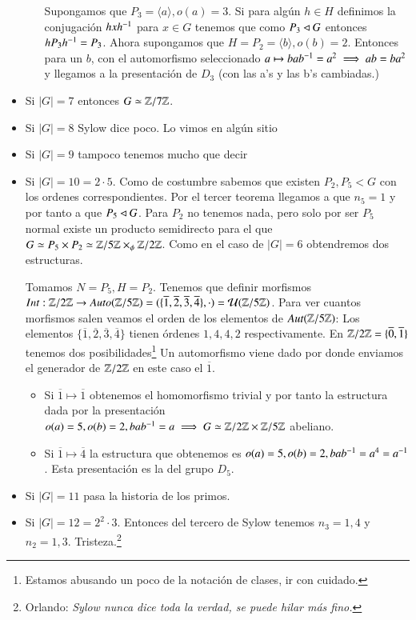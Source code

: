 \begin{ej}
\begin{itemize}
\begin{itemize}
			Supongamos que $P_3 = \langle a \rangle, o(a) = 3$. Si para algún $h\in H$ definimos la conjugación $hxh^{-1}$ para $x \in G$ tenemos que como $P_3 \lhd G$ entonces $hP_3h^{-1} = P_3$. Ahora supongamos que $H = P_2 = \langle b \rangle, o(b) = 2$. Entonces para un $b$, con el automorfismo seleccionado $a \mapsto bab^{-1} = a^2 \implies ab = ba^2$ y llegamos a la presentación de $D_3$ (con las a's y las b's cambiadas.)
		\end{itemize}
		
		\item Si $|G| = 7$ entonces $G \simeq \mathbb{Z}/7\mathbb{Z}$.
		\item Si $|G| = 8$ Sylow dice poco. Lo vimos en algún sitio %
		\item Si $|G| = 9$ tampoco tenemos mucho que decir
		\item Si $|G| = 10 = 2\cdot 5$. Como de costumbre sabemos que existen $P_2, P_5 < G$ con los ordenes correspondientes. Por el tercer teorema llegamos a que $n_5 = 1$ y por tanto a que $P_5 \lhd G$. Para $P_2$ no tenemos nada, pero solo por ser $P_5$ normal existe un producto semidirecto para el que $G \simeq P_5 \times P_2 \simeq \mathbb{Z}/5\mathbb{Z} \times_\phi \mathbb{Z}/2\mathbb{Z}$. Como en el caso de $|G| = 6$ obtendremos dos estructuras.
		
		Tomamos $N = P_5, H = P_2$. Tenemos que definir morfismos $Int: \mathbb{Z}/2\mathbb{Z} \to Auto(\mathbb{Z}/5\mathbb{Z}) = (\{\overline{1}, \overline{2}, \overline{3}, \overline{4}\}, \cdot ) = \mathcal{U}(\mathbb{Z}/5\mathbb{Z})$. Para ver cuantos morfismos salen veamos el orden de los elementos de $Aut(\mathbb{Z}/5\mathbb{Z})$: Los elementos $\{\overline{1}, \overline{2}, \overline{3}, \overline{4}\}$ tienen órdenes $1,4,4,2$ respectivamente. En $\mathbb{Z}/2\mathbb{Z} = \{\overline{0}, \overline{1}\}$ tenemos dos posibilidades\footnote{Estamos abusando un poco de la notación de clases, ir con cuidado.} Un automorfismo viene dado por donde enviamos el generador de $\mathbb{Z}/2\mathbb{Z}$ en este caso el $\overline{1}$.
		\begin{itemize}
			\item Si $\overline{1} \mapsto \overline{1}$ obtenemos el homomorfismo trivial y por tanto la estructura dada por la presentación $o(a) = 5, o(b) = 2, bab^{-1} = a \implies G \simeq \mathbb{Z}/2\mathbb{Z} \times \mathbb{Z}/5\mathbb{Z}$ abeliano.
			\item Si $\overline{1} \mapsto \overline{4}$ la estructura que obtenemos es $o(a) = 5, o(b) = 2, bab^{-1} = a^4 = a^{-1}$. Esta presentación es la del grupo $D_5$.
		\end{itemize}
	\item Si $|G| = 11$ pasa la historia de los primos.
	\item Si $|G| = 12 = 2^2 \cdot 3$. Entonces del tercero de Sylow tenemos $n_3 = 1, 4$ y $n_2 = 1, 3$. Tristeza.\footnote{Orlando: \textit{Sylow nunca dice toda la verdad, se puede hilar más fino.}}
	

\end{itemize}
\end{ej}
